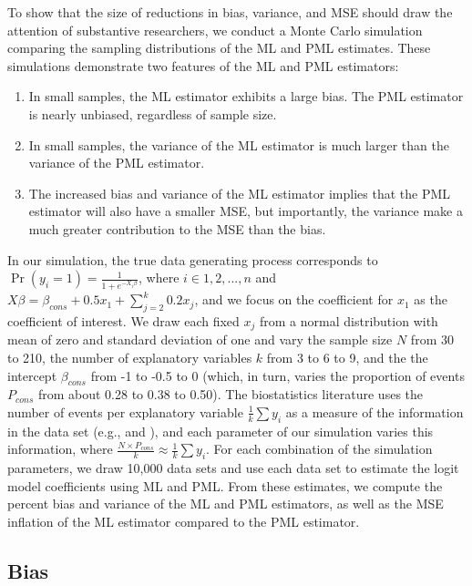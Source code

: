 \documentclass[12pt]{article}
\begin{document}
To show that the size of reductions in bias, variance, and MSE should draw the attention of substantive researchers, we conduct a Monte Carlo simulation comparing the sampling distributions of the ML and PML estimates.
These simulations demonstrate two features of the ML and PML estimators:
\begin{enumerate}
\item In small samples, the ML estimator exhibits a large bias. The PML estimator is nearly unbiased, regardless of sample size.
\item In small samples, the variance of the ML estimator is much larger than the variance of the PML estimator.
\item The increased bias and variance of the ML estimator implies that the PML estimator will also have a smaller MSE, but importantly, the variance make a much greater contribution to the MSE than the bias.
\end{enumerate}

In our simulation, the true data generating process corresponds to $\Pr(y_i = 1) = \frac{1}{1 + e^{-X_i \beta}}$, where $i \in 1, 2,..., n$ and $X \beta = \beta_{cons} + 0.5 x_1 + \sum_{j = 2}^k 0.2 x_j$, and we focus on the coefficient for $x_1$ as the coefficient of interest.
We draw each fixed $x_j$ from a normal distribution with mean of zero and standard deviation of one and vary the sample size $N$ from 30 to 210, the number of explanatory variables $k$ from 3 to 6 to 9, and the the intercept $\beta_{cons}$ from -1 to -0.5 to 0 (which, in turn, varies the proportion of events $P_{cons}$ from about 0.28 to 0.38 to 0.50).
The biostatistics literature uses the number of events per explanatory variable $\frac{1}{k}\sum y_i$ as a measure of the information in the data set (e.g., \citealt{Peduzzietal1996} and \citealt{VittinghoffMcCulloch2007}), and each parameter of our simulation varies this information, where $ \frac{N \times P_{cons}}{k} \approx \frac{1}{k}\sum y_i$.
For each combination of the simulation parameters, we draw 10,000 data sets and use each data set to estimate the logit model coefficients using ML and PML. 
From these estimates, we compute the percent bias and variance of the ML and PML estimators, as well as the MSE inflation of the ML estimator compared to the PML estimator.

\subsection*{Bias}
\end{document}
